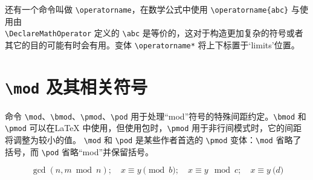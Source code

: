 还有一个命令叫做 \verb|\operatorname|，在数学公式中使用 \verb|\operatorname{abc}| 与使用由\\ \verb|\DeclareMathOperator| 定义的 \verb|\abc| 是等价的，这对于构造更加复杂的符号或者其它的目的可能有时会有用。变体 \verb|\operatorname*| 将上下标置于‘limits’位置。
\cprotect\section{\verb|\mod| 及其相关符号}
命令 \verb|\mod|、\verb|\bmod|、\verb|\pmod|、\verb|\pod| 用于处理“mod”符号的特殊间距约定。\verb|\bmod| 和 \verb|\pmod| 可以在\LaTeX{} 中使用，但使用包时，\verb|\pmod| 用于非行间模式时，它的间距将调整为较小的值。 \verb|\mod| 和 \verb|\pod| 是某些作者首选的 \verb|\pmod| 变体：\verb|\mod| 省略了括号，而 \verb|\pod| 省略“mod”并保留括号。
\begin{tcblisting}{}
\begin{equation}
\gcd(n,m\bmod n);\quad x\equiv  y\pmod b;
\quad x\equiv y\mod c;\quad x\equiv y\pod d
\end{equation}
\end{tcblisting}
